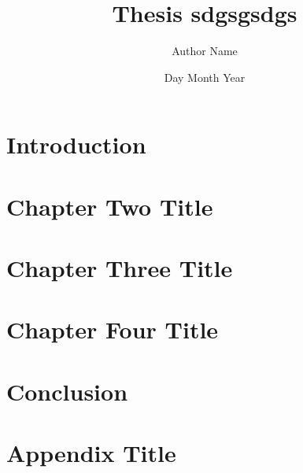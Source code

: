 \documentclass[12pt,twoside]{report}
\title{Thesis sdgsgsdgs}
\author{Author Name}
\date{Day Month Year}
\begin{document}







\tableofcontents
\label{toc}



\chapter{Introduction}


\chapter{Chapter Two Title}


\chapter{Chapter Three Title}


\chapter{Chapter Four Title}


\chapter{Conclusion}


\appendix
\chapter{Appendix Title}


\printbibliography
\end{document}
